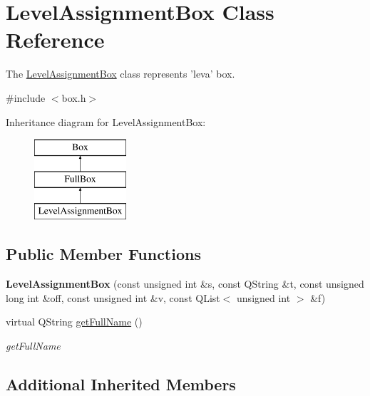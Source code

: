 \hypertarget{class_level_assignment_box}{\section{Level\-Assignment\-Box Class Reference}
\label{class_level_assignment_box}
}


The \hyperlink{class_level_assignment_box}{Level\-Assignment\-Box} class represents 'leva' box.  




{\ttfamily \#include $<$box.\-h$>$}

Inheritance diagram for Level\-Assignment\-Box\-:\begin{figure}[H]
\begin{center}
\leavevmode
\includegraphics[height=3.000000cm]{class_level_assignment_box}
\end{center}
\end{figure}
\subsection*{Public Member Functions}
\begin{DoxyCompactItemize}
\item 
\hypertarget{class_level_assignment_box_a97908554f9e20989b4befc265c10685e}{{\bfseries Level\-Assignment\-Box} (const unsigned int \&s, const Q\-String \&t, const unsigned long int \&off, const unsigned int \&v, const Q\-List$<$ unsigned int $>$ \&f)}\label{class_level_assignment_box_a97908554f9e20989b4befc265c10685e}

\item 
virtual Q\-String \hyperlink{class_level_assignment_box_a9b2449445de5d18f29915acce604d858}{get\-Full\-Name} ()
\begin{DoxyCompactList}\small\item\em get\-Full\-Name \end{DoxyCompactList}\end{DoxyCompactItemize}
\subsection*{Additional Inherited Members}


